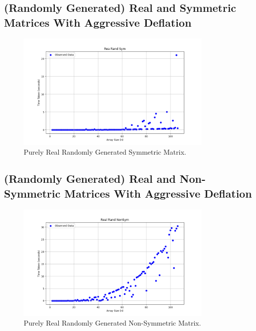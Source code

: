 \documentclass[12pt]{article}
\begin{document}
 	\subsection{(Randomly Generated) Real and Symmetric Matrices With Aggressive Deflation}
 	\begin{figure}[h]
 		\centering
 		\includegraphics[width=0.85\textwidth]{figs/rrs.png}
 		\caption{Purely Real Randomly Generated Symmetric Matrix.}
 	\end{figure}
 	\subsection{(Randomly Generated) Real and Non-Symmetric Matrices With Aggressive Deflation}
 	\begin{figure}[h]
 		\centering
 		\includegraphics[width=0.85\textwidth]{figs/rrns.png}
 		\caption{Purely Real Randomly Generated Non-Symmetric Matrix.}
 	\end{figure}
\end{document}
